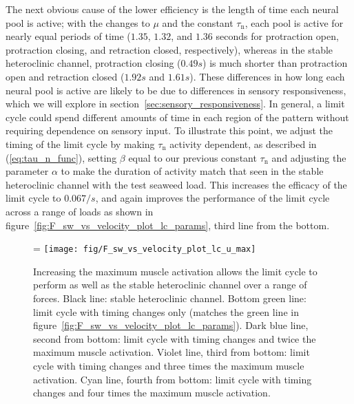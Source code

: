 The next obvious cause of the lower efficiency is the length of time each
neural pool is active; with the changes to $\mu$ and the constant
$\tau_\textrm{n}$, each pool is active for nearly equal periods of time
($1.35$, $1.32$, and $1.36$ seconds for protraction open, protraction closing,
and retraction closed, respectively), whereas in the stable heteroclinic
channel, protraction closing ($0.49 s$) is much shorter than protraction open
and retraction closed ($1.92s$ and $1.61s$).  These differences in how long
each neural pool is active are likely to be due to differences in sensory
responsiveness, which we will explore in
section~\ref{sec:sensory_responsiveness}.  In general, a limit cycle could spend
different amounts of time in each region of the pattern without requiring dependence
on sensory input. To illustrate this point, we adjust the timing
of the limit cycle by making $\tau_\textrm{n}$ activity dependent, as described
in (\ref{eq:tau_n_func}), setting $\beta$ equal to our previous constant
$\tau_\textrm{n}$ and adjusting the parameter $\alpha$ to make the duration of
activity match that seen in the stable heteroclinic channel with the test
seaweed load.  This increases the efficacy of the limit cycle to $0.067/s$, and
again improves the performance of the limit cycle across a range of loads as
shown in figure~\ref{fig:F_sw_vs_velocity_plot_lc_params}, third line from the
bottom.

\begin{figure}
    \ifthesis
        \linewidth
    \else
        \figwidth=\linewidth
    \fi
    \centering
    \texttt{[image: fig/F\_sw\_vs\_velocity\_plot\_lc\_u\_max]}
    \caption[Improved efficacy with increased maximum muscle activation]{
    Increasing the maximum muscle activation allows the limit
    cycle to perform as well as the stable heteroclinic channel over a
    range of forces.  Black line: stable heteroclinic channel.  Bottom
    green line: limit cycle with timing changes only (matches the green line in
    figure~\ref{fig:F_sw_vs_velocity_plot_lc_params}).  Dark blue line, second
    from bottom: limit cycle with timing changes and twice the maximum
    muscle activation.  Violet line, third from bottom: limit cycle with
    timing changes and three times the maximum muscle activation.  Cyan line,
    fourth from bottom: limit cycle with timing changes and four times
    the maximum muscle activation.}
    \label{fig:F_sw_vs_velocity_plot_lc_u_max}
\end{figure}

